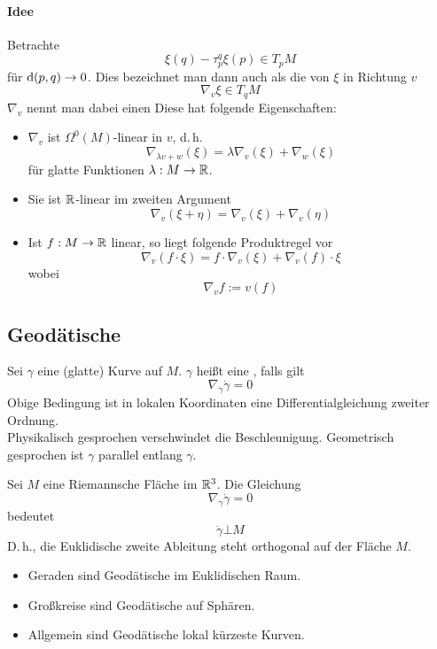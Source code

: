 \paragraph{Idee}
Betrachte
\[ \xi(q) - \tau^q_p\xi(p) \in T_pM  \]
für $\text{d}(p,q) \overset{}{\rightarrow} 0$. Dies bezeichnet man dann auch als die  von $\xi$ in Richtung $v$
\[ \nabla_v\xi \in T_qM \]
$\nabla_v$ nennt man dabei einen  Diese hat folgende Eigenschaften:
\begin{itemize}
	\item $\nabla_v$ ist $\Omega^0(M)$-linear in $v$, d.\,h.
	\[ \nabla_{\lambda v + w}(\xi) = \lambda \nabla_{v} (\xi) + \nabla_{w} (\xi) \]
	für glatte Funktionen $\lambda : M \overset{}{\rightarrow} \mathbb{R}$.
	\item Sie ist $\mathbb{R}$-linear im zweiten Argument
	\[ \nabla_{v}(\xi + \eta) = \nabla_{v}(\xi) + \nabla_{v}(\eta) \]
	\item Ist $f : M \overset{}{\rightarrow} \mathbb{R}$ linear, so liegt folgende Produktregel vor
	\[ \nabla_{v}(f\cdot \xi) = f \cdot \nabla_{v}(\xi) + \nabla_{v}(f) \cdot \xi \]
	wobei
	\[ \nabla_{v} f := v(f) \]
\end{itemize}


\subsection{Geodätische}
Sei $\gamma$ eine (glatte) Kurve auf $M$. $\gamma$ heißt eine , falls gilt
\[ \nabla_{\dot{\gamma}}\dot{\gamma} = 0 \]
Obige Bedingung ist in lokalen Koordinaten eine Differentialgleichung zweiter Ordnung.\\
Physikalisch gesprochen verschwindet die Beschleunigung. Geometrisch gesprochen ist $\gamma$ parallel entlang $\gamma$.

\Bsp{}
Sei $M$ eine Riemannsche Fläche im $\mathbb{R}^3$. Die Gleichung
\[ \nabla_{\dot{\gamma}}\dot{\gamma} = 0 \]
bedeutet
\[ \ddot{\gamma} \bot M \]
D.\,h., die Euklidische zweite Ableitung steht orthogonal auf der Fläche $M$.

\Bsp{}
\begin{itemize}
	\item Geraden sind Geodätische im Euklidischen Raum.
	\item Großkreise sind Geodätische auf Sphären.
	\item Allgemein sind Geodätische lokal kürzeste Kurven.
\end{itemize}

\newpage
